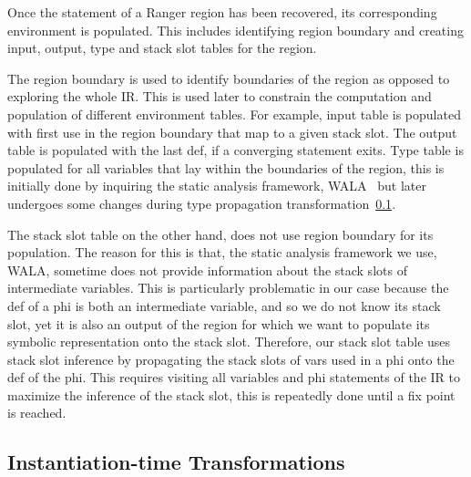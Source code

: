 Once the statement of a Ranger region has been recovered, its corresponding environment is populated. This includes identifying region boundary and creating input, output, type and stack slot tables for the region.

The region boundary is used to identify boundaries of the region as opposed to exploring the whole IR. This is used later to constrain the computation and population of different environment tables. For example, input table is populated with first use in the region boundary that map to a given stack slot. The output table is populated with the last def, if a converging statement exits. Type table is populated for all variables that lay within the boundaries of the region, this is initially done by inquiring the static analysis framework, WALA~\cite{Wala} but later undergoes some changes during type propagation transformation~\ref{sec:instantiationTransformations}. 

The stack slot table on the other hand, does not use region boundary for its population. The reason for this is that, the static analysis framework we use, WALA, sometime does not provide information about the stack slots of intermediate variables. This is particularly problematic in our case because the def of a phi is both an intermediate variable, and so we do not know its stack slot, yet it is also an output of the region for which we want to populate its symbolic representation onto the stack slot. Therefore, our stack slot table uses stack slot inference by propagating the stack slots of vars used in a phi onto the def of the phi. This requires visiting all variables and phi statements of the IR to maximize the inference of the stack slot, this is repeatedly done until a fix point is reached.


\subsection{Instantiation-time Transformations}
\label{sec:instantiationTransformations}


